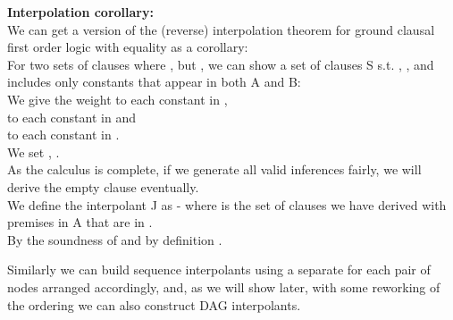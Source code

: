 \textbf{Interpolation corollary:}\\
We can get a version of the (reverse) interpolation theorem for ground clausal first order logic with equality as a corollary:\\
For two sets of clauses  where ,  but 
, we can show a set of clauses S s.t. , , 
and  includes only constants that appear in both A and B:\\
We give the weight  to each constant in ,\\
 to each constant in  and \\
 to each constant in .\\
We set , .\\
As the calculus is complete, if we generate all valid inferences fairly, we will derive the empty clause eventually.\\
We define the interpolant J as  - where  is the set of clauses we have derived with premises in A that are in .\\
By the soundness of   and by definition .

Similarly we can build sequence interpolants using a separate  for each pair of nodes arranged accordingly,
and, as we will show later, with some reworking of the ordering we can also construct DAG interpolants.

